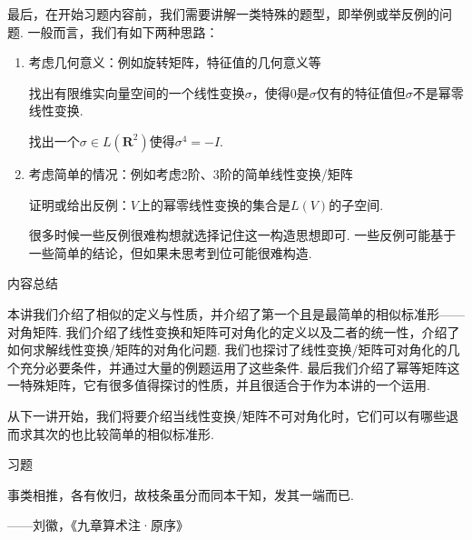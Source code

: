 \begin{solution}

\end{solution}

最后，在开始习题内容前，我们需要讲解一类特殊的题型，即举例或举反例的问题. 一般而言，我们有如下两种思路：
\begin{enumerate}
    \item 考虑几何意义：例如旋转矩阵，特征值的几何意义等
          \begin{example}{}{}
              找出有限维实向量空间的一个线性变换$\sigma$，使得0是$\sigma$仅有的特征值但$\sigma$不是幂零线性变换.
          \end{example}
          \begin{example}{}{}
              找出一个$\sigma\in L(\mathbf{R}^2)$使得$\sigma^4=-I$.
          \end{example}

    \item 考虑简单的情况：例如考虑2阶、3阶的简单线性变换/矩阵
          \begin{example}{}{}
              证明或给出反例：$V$上的幂零线性变换的集合是$L(V)$的子空间.
          \end{example}
          很多时候一些反例很难构想就选择记住这一构造思想即可. 一些反例可能基于一些简单的结论，但如果未思考到位可能很难构造.
\end{enumerate}

\vspace{2ex}
\centerline{\heiti \Large 内容总结}

本讲我们介绍了相似的定义与性质，并介绍了第一个且是最简单的相似标准形——对角矩阵. 我们介绍了线性变换和矩阵可对角化的定义以及二者的统一性，介绍了如何求解线性变换/矩阵的对角化问题. 我们也探讨了线性变换/矩阵可对角化的几个充分必要条件，并通过大量的例题运用了这些条件. 最后我们介绍了幂等矩阵这一特殊矩阵，它有很多值得探讨的性质，并且很适合于作为本讲的一个运用.

从下一讲开始，我们将要介绍当线性变换/矩阵不可对角化时，它们可以有哪些退而求其次的也比较简单的相似标准形.

\vspace{2ex}
\centerline{\heiti \Large 习题}

\vspace{2ex}
{\kaishu 事类相推，各有攸归，故枝条虽分而同本干知，发其一端而已.}
\begin{flushright}
    \kaishu
    ——刘徽，《九章算术注·原序》
\end{flushright}

